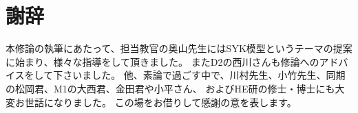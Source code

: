 \section*{謝辞}
本修論の執筆にあたって、担当教官の奥山先生にはSYK模型というテーマの提案に始まり、様々な指導をして頂きました。
またD2の西川さんも修論へのアドバイスをして下さいました。
他、素論で過ごす中で、川村先生、小竹先生、同期の松岡君、M1の大西君、金田君や小平さん、
およびHE研の修士・博士にも大変お世話になりました。
この場をお借りして感謝の意を表します。
\pagebreak